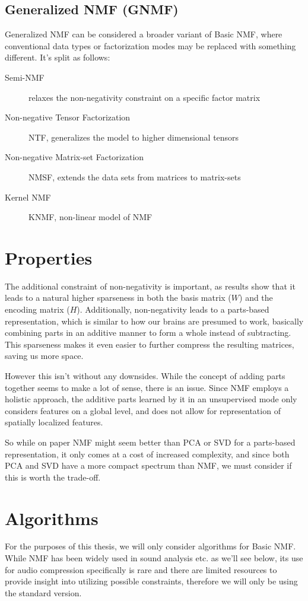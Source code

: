 \subsection{Generalized NMF (GNMF)}
Generalized NMF can be considered a broader variant of Basic NMF, where conventional data types or factorization modes may be replaced with something different. It's split as follows:

\begin{description}
	\item[Semi-NMF] relaxes the non-negativity constraint on a specific factor matrix
	\item[Non-negative Tensor Factorization] NTF, generalizes the model to higher dimensional tensors
	\item[Non-negative Matrix-set Factorization] NMSF, extends the data sets from matrices to matrix-sets
	\item[Kernel NMF] KNMF, non-linear model of NMF
\end{description}

\section{Properties}
The additional constraint of non-negativity is important, as results show that it leads to a natural higher sparseness in both the basis matrix ($W$) and the encoding matrix ($H$). Additionally, non-negativity leads to a parts-based representation, which is similar to how our brains are presumed to work, basically combining parts in an additive manner to form a whole instead of subtracting. \cite{nmf_parts_objects} This sparseness makes it even easier to further compress the resulting matrices, saving us more space.

However this isn't without any downsides. While the concept of adding parts together seems to make a lot of sense, there is an issue. Since NMF employs a holistic approach, the additive parts learned by it in an unsupervised mode only considers features on a global level, and does not allow for representation of spatially localized features. \cite{li_spatial_lnmf_2001}

So while on paper NMF might seem better than PCA or SVD for a parts-based representation, it only comes at a cost of increased complexity, and since both PCA and SVD have a more compact spectrum than NMF, we must consider if this is worth the trade-off. \cite{wang_zhang_2013}

\section{Algorithms}
For the purposes of this thesis, we will only consider algorithms for Basic NMF. While NMF has been widely used in sound analysis etc. as we'll see below, its use for audio compression specifically is rare and there are limited resources to provide insight into utilizing possible constraints, therefore we will only be using the standard version.

